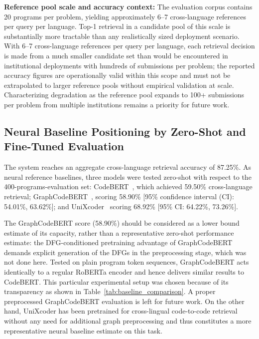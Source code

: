 \textbf{Reference pool scale and accuracy context:} The evaluation corpus contains 20 programs per problem, yielding approximately 6--7 cross-language references per query per language. Top-1 retrieval in a candidate pool of this scale is substantially more tractable than any realistically sized deployment scenario. With 6--7 cross-language references per query per language, each retrieval decision is made from a much smaller candidate set than would be encountered in institutional deployments with hundreds of submissions per problem; the reported accuracy figures are operationally valid within this scope and must not be extrapolated to larger reference pools without empirical validation at scale. Characterizing degradation as the reference pool expands to 100+ submissions per problem from multiple institutions remains a priority for future work.

\subsection{Neural Baseline Positioning by Zero-Shot and Fine-Tuned Evaluation}
\label{subsec:neural_comparison}

The system reaches an aggregate cross-language retrieval accuracy of 87.25\%. As neural reference baselines, three models were tested zero-shot with respect to the 400-programs-evaluation set: CodeBERT~\cite{ref_codebert}, which achieved 59.50\% cross-language retrieval; GraphCodeBERT~\cite{ref_graphcodebert}, scoring 58.90\% [95\% confidence interval (CI): 54.01\%, 63.62\%]; and UniXcoder~\cite{ref_unixcoder} scoring 68.92\% [95\% CI: 64.22\%, 73.26\%].

The GraphCodeBERT score (58.90\%) should be considered as a lower bound estimate of its capacity, rather than a representative zero-shot performance estimate: the DFG-conditioned pretraining advantage of GraphCodeBERT demands explicit generation of the DFGs in the preprocessing stage, which was not done here. Tested on plain program token sequences, GraphCodeBERT acts identically to a regular RoBERTa encoder and hence delivers similar results to CodeBERT. This particular experimental setup was chosen because of its transparency as shown in Table~\ref{tab:baseline_comparison}. A proper preprocessed GraphCodeBERT evaluation is left for future work. On the other hand, UniXcoder has been pretrained for cross-lingual code-to-code retrieval without any need for additional graph preprocessing and thus constitutes a more representative neural baseline estimate on this task.

